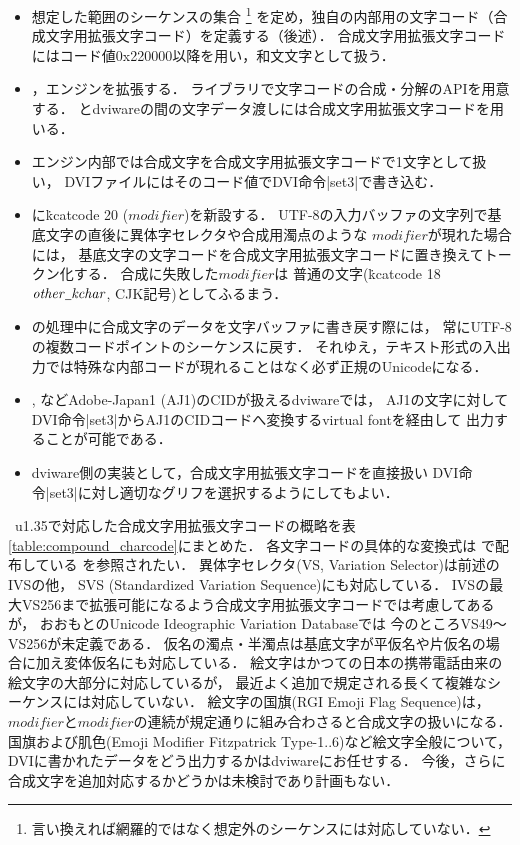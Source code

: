 \documentclass[a4paper,11pt,nomag,dvipdfmx]{jsarticle}
\def\_{\leavevmode\vrule width .45em height -.2ex depth .3ex\relax}
\begin{document}
\begin{itemize}
 \item 想定した範囲のシーケンスの集合%
   \footnote{言い換えれば網羅的ではなく想定外のシーケンスには対応していない．}%
   を定め，\upTeX 独自の内部用の文字コード（合成文字用拡張文字コード）を定義する（後述）．
   合成文字用拡張文字コードにはコード値0x220000以降を用い，和文文字として扱う．
 \item {}，\upTeX エンジンを拡張する．
   ライブラリで文字コードの合成・分解のAPIを用意する．
   \upTeX とdviwareの間の文字データ渡しには合成文字用拡張文字コードを用いる．
 \item \upTeX エンジン内部では合成文字を合成文字用拡張文字コードで1文字として扱い，
   DVIファイルにはそのコード値でDVI命令|set3|で書き込む．
 \item \upTeX に\.{kcatcode} 20 ($\mathit{modifier}$)を新設する．
   UTF-8の入力バッファの文字列で基底文字の直後に異体字セレクタや合成用濁点のような
   $\mathit{modifier}$が現れた場合には，
   基底文字の文字コードを合成文字用拡張文字コードに置き換えてトークン化する．
   合成に失敗した$\mathit{modifier}$は
   普通の文字(\.{kcatcode} 18 $\mathit{other\_kchar}$, CJK記号)としてふるまう．
 \item \upTeX の処理中に合成文字のデータを文字バッファに書き戻す際には，
   常にUTF-8の複数コードポイントのシーケンスに戻す．
   それゆえ，テキスト形式の入出力では特殊な内部コードが現れることはなく必ず正規のUnicodeになる．
 \item {}, などAdobe-Japan1 (AJ1)のCIDが扱えるdviwareでは，
   AJ1の文字に対してDVI命令|set3|からAJ1のCIDコードへ変換するvirtual fontを経由して
   出力することが可能である．
 \item dviware側の実装として，合成文字用拡張文字コードを直接扱い
   DVI命令|set3|に対し適切なグリフを選択するようにしてもよい．
\end{itemize}

\upTeX~u1.35で対応した合成文字用拡張文字コードの概略を表\ref{table:compound_charcode}にまとめた．
各文字コードの具体的な変換式は
\href{https://github.com/texjporg/uptex-base}{}で配布している
を参照されたい．
異体字セレクタ(VS, Variation Selector)は前述のIVSの他，
SVS (Standardized Variation Sequence)にも対応している．
IVSの最大VS256まで拡張可能になるよう合成文字用拡張文字コードでは考慮してあるが，
おおもとのUnicode Ideographic Variation Database\cite{ivd220913}では
今のところVS49〜VS256が未定義である．
仮名の濁点・半濁点は基底文字が平仮名や片仮名の場合に加え変体仮名にも対応している．
絵文字はかつての日本の携帯電話由来の絵文字の大部分に対応しているが，
最近よく追加で規定される長くて複雑なシーケンスには対応していない．
絵文字の国旗(RGI Emoji Flag Sequence)は，
$\mathit{modifier}$と$\mathit{modifier}$の連続が規定通りに組み合わさると合成文字の扱いになる．
国旗および肌色(Emoji Modifier Fitzpatrick Type-1..6)など絵文字全般について，
DVIに書かれたデータをどう出力するかはdviwareにお任せする．
今後，さらに合成文字を追加対応するかどうかは未検討であり計画もない．
\end{document}
